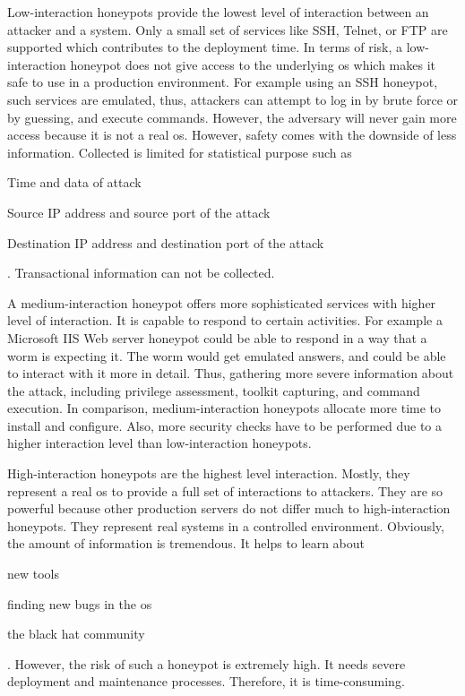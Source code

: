 Low-interaction honeypots provide the lowest level of interaction between an attacker and a system.
Only a small set of services like SSH, Telnet, or FTP are supported which contributes to the deployment time.
In terms of risk, a low-interaction honeypot does not give access to the underlying \ac{os} which makes it safe to use in a production environment.
For example using an SSH honeypot, such services are emulated, thus, attackers can attempt to log in by brute force or by guessing, and execute commands.
However, the adversary will never gain more access because it is not a real \ac{os}.
However, safety comes with the downside of less information.
Collected is limited for statistical purpose such as
\begin{enumerate*}[label=(\roman*)]
    \item Time and data of attack
    \item Source IP address and source port of the attack
    \item Destination IP address and destination port of the attack
\end{enumerate*}.
Transactional information can not be collected. \cite{Spitzner2003}

A medium-interaction honeypot offers more sophisticated services with higher level of interaction.
It is capable to respond to certain activities.
For example a Microsoft IIS Web server honeypot could be able to respond in a way that a worm is expecting it.
The worm would get emulated answers, and could be able to interact with it more in detail.
Thus, gathering more severe information about the attack, including privilege assessment, toolkit capturing, and command execution.
In comparison, medium-interaction honeypots allocate more time to install and configure.
Also, more security checks have to be performed due to a higher interaction level than low-interaction honeypots. \cite{Spitzner2003}

High-interaction honeypots are the highest level interaction.
Mostly, they represent a real \ac{os} to provide a full set of interactions to attackers.
They are so powerful because other production servers do not differ much to high-interaction honeypots.
They represent real systems in a controlled environment.
Obviously, the amount of information is tremendous. It helps to learn about
\begin{enumerate*}[label=(\roman*)]
    \item new tools
    \item finding new bugs in the \ac{os}
    \item the black hat community
\end{enumerate*}. However, the risk of such a honeypot is extremely high.
It needs severe deployment and maintenance processes.
Therefore, it is time-consuming.

